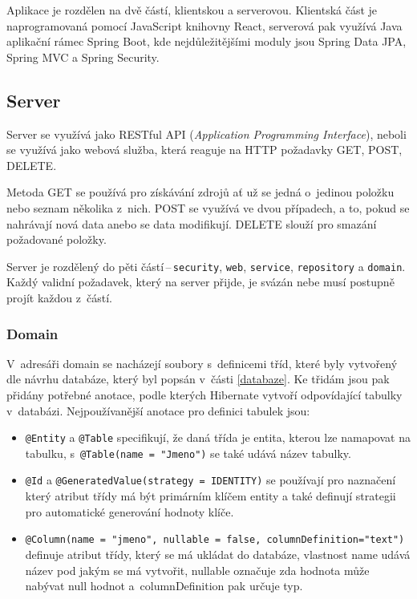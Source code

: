 Aplikace je rozdělen na dvě částí, klientskou a serverovou. Klientská část je naprogramovaná pomocí JavaScript knihovny React, serverová pak využívá Java aplikační rámec Spring Boot, kde nejdůležitějšími moduly jsou Spring Data JPA, Spring MVC a Spring Security.

\subsection{Server}

Server se využívá jako RESTful API (\textit{Application Programming Interface}), neboli se využívá jako webová služba, která reaguje na HTTP požadavky GET, POST, DELETE.

Metoda GET se používá pro získávání zdrojů ať už se jedná o~jedinou položku nebo seznam několika z~nich. POST se využívá ve dvou případech, a to, pokud se nahrávají nová data anebo se data modifikují. DELETE slouží pro smazání požadované položky.

Server je rozdělený do pěti částí\,--\,\texttt{security}, \texttt{web}, \texttt{service}, \texttt{repository} a \texttt{domain}. Každý validní požadavek, který na server přijde, je svázán nebe musí postupně projít každou z~částí.

\subsubsection *{Domain}

V~adresáři domain se nacházejí soubory s~definicemi tříd, které byly vytvořený dle návrhu databáze, který byl popsán v~části \ref{databaze}. Ke třidám jsou pak přidány potřebné anotace, podle kterých Hibernate vytvoří odpovídající tabulky v~databázi. Nejpoužívanější anotace pro definici tabulek jsou: 

\begin{itemize}
    \item \texttt{@Entity} a \texttt{@Table} specifikují, že daná třída je entita, kterou lze namapovat na tabulku, s~\texttt{@Table(name = "Jmeno")} se také udává název tabulky.
    \item \texttt{@Id} a \texttt{@GeneratedValue(strategy = IDENTITY)} se používají pro naznačení který atribut třídy má být primárním klíčem entity a také definují strategii pro automatické generování hodnoty klíče.
    \item\texttt{@Column(name = "jmeno", nullable = false, columnDefinition="text")} definuje atribut třídy, který se má ukládat do databáze, vlastnost name udává název pod jakým se má vytvořit, nullable označuje zda hodnota může nabývat null hodnot a~columnDefinition pak určuje typ.
\end{itemize}

